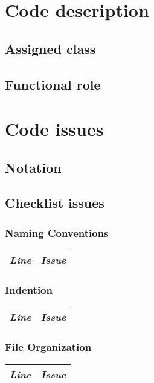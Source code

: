 \documentclass[11pt,a4paper]{report}
\begin{document}


\thispagestyle{empty}
\tableofcontents
\cleardoublepage
{}
\pagestyle{fancy}

\chapter{Code description}
\section{Assigned class}
\section{Functional role}
\chapter{Code issues}
\section{Notation}
\section{Checklist issues}
\subsection{Naming Conventions}
\begin{tabularx}{\textwidth}{|l|X|}
	\hline
	\textit{Line} & \textit{Issue}\\
	\hline
\end{tabularx}
\subsection{Indention}
\begin{tabularx}{\textwidth}{|l|X|}
	\hline
	\textit{Line} & \textit{Issue}\\
	\hline
\end{tabularx}
\subsection{File Organization}
\begin{tabularx}{\textwidth}{|l|X|}
	\hline
	\textit{Line} & \textit{Issue}\\
	\hline
\end{tabularx}
\end{document}
